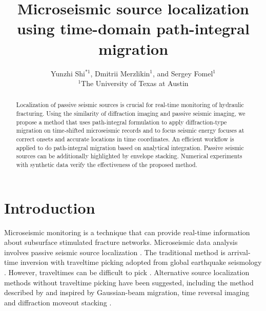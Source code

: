 
\title{Microseismic source localization using time-domain path-integral migration}

\author{Yunzhi Shi$^{*1}$, Dmitrii Merzlikin$^1$, and Sergey Fomel$^1$
\\
$^1$The University of Texas at Austin}

\maketitle




\begin{abstract}
Localization of passive seismic sources is crucial for real-time monitoring of hydraulic fracturing.
Using the similarity of diffraction imaging and passive seismic imaging, we propose a method that uses path-integral formulation to apply diffraction-type migration on time-shifted microseismic records and to focus seismic energy focuses at correct onsets and accurate locations in time coordinates.
An efficient workflow is applied to do path-integral migration based on analytical integration.
Passive seismic sources can be additionally highlighted by envelope stacking.
Numerical experiments with synthetic data verify the effectiveness of the proposed method.
\end{abstract}

\section{Introduction}
Microseismic monitoring is a technique that can provide real-time information about subsurface stimulated fracture networks.
Microseismic data analysis involves passive seismic source localization \cite[]{maxwell2014microseismic}.
The traditional method is arrival-time inversion with traveltime picking adopted from global earthquake seismology \cite[]{warpinski1998mapping,gibowicz2013introduction}.
However, traveltimes can be difficult to pick \cite[]{duncan2010reservoir}.
Alternative source localization methods without traveltime picking have been suggested, including the method described by \cite{rentsch2006fast,rentsch2010migration} and inspired by Gaussian-beam migration, time reversal imaging \cite[]{gajewski2005reverse,artman2010source} and diffraction moveout stacking \cite[]{kao2004source,gajewski2007localization}.

